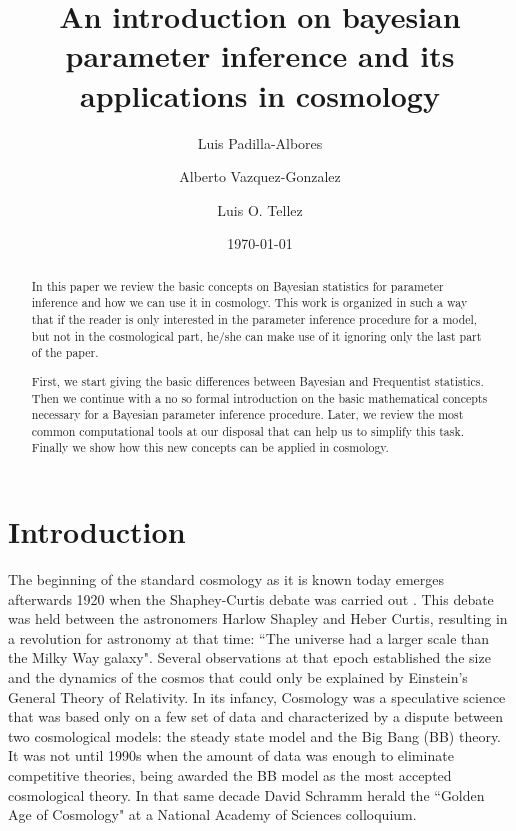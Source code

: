 \documentclass[onecolumn,           %
               showpacs,            %
               preprintnumbers,     %
               aps,                 %
               prl,          	    %
               letterpaper,             %
               superscriptaddress,      %
               nofootinbib,         %
               tightenlines,        %
               floats,floatfix      %
               ,usenatbib,
               ]{revtex4-1}
\begin{document}
\title{An introduction on bayesian parameter inference and its applications in cosmology}
\author{Luis Padilla-Albores}  
   \author{Alberto Vazquez-Gonzalez}  
  \author{Luis O. Tellez}  
\date{\today}

\begin{abstract}

In this paper we review the basic concepts on Bayesian statistics for parameter inference and how we can use it in cosmology. This work is organized in such a way that if the reader is only interested in the parameter inference procedure for a model, but not in the cosmological part, he/she can make use of it ignoring only the last part of the paper. 

First, we start giving the basic differences between Bayesian and Frequentist statistics. Then we continue with a no so formal introduction on the basic mathematical concepts necessary for a Bayesian parameter inference procedure. Later, we review the most common computational tools at our disposal that can help us to simplify this task. Finally we show how this new concepts can be applied in cosmology.     
\end{abstract}

\maketitle

\section{Introduction}

The beginning of the standard cosmology as it is known today emerges afterwards 1920 when the Shaphey-Curtis debate was carried out \cite{debate}. This debate was held between the astronomers Harlow Shapley and Heber Curtis, resulting in a revolution for astronomy at that time: ``The universe had a larger scale than the Milky Way galaxy". Several observations at that epoch established the size and the dynamics of the cosmos that could only be explained by Einstein's General Theory of Relativity. In its infancy, Cosmology was a speculative science that was based only on a few set of data and characterized by a dispute between two cosmological models: the steady state model and the Big Bang (BB) theory. It was not until 1990s when the amount of data was enough to eliminate competitive theories, being awarded the BB model as the most accepted cosmological theory. In that same decade David Schramm herald the ``Golden Age of Cosmology" at a National Academy of Sciences colloquium.    
\end{document}
